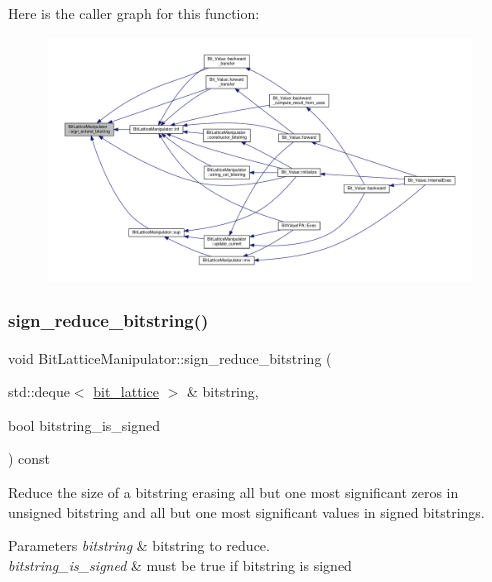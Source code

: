Here is the caller graph for this function\+:
\nopagebreak
\begin{figure}[H]
\begin{center}
\leavevmode
\includegraphics[width=350pt]{dd/d98/classBitLatticeManipulator_a4f374ceca7857bb7bc52a31f3f9872f9_icgraph}
\end{center}
\end{figure}
\mbox{\label{classBitLatticeManipulator_a1783e3d23d32aed27ec5ada1229516dc}} 
\subsubsection{\texorpdfstring{sign\+\_\+reduce\+\_\+bitstring()}{sign\_reduce\_bitstring()}}
{\footnotesize\ttfamily void Bit\+Lattice\+Manipulator\+::sign\+\_\+reduce\+\_\+bitstring (\begin{DoxyParamCaption}\item[{std\+::deque$<$ \hyperlink{bit__lattice_8hpp_ab732360111c810c4eaeb4c8b81d160d6}{bit\+\_\+lattice} $>$ \&}]{bitstring,  }\item[{bool}]{bitstring\+\_\+is\+\_\+signed }\end{DoxyParamCaption}) const\hspace{0.3cm}{\ttfamily [protected]}}



Reduce the size of a bitstring erasing all but one most significant zeros in unsigned bitstring and all but one most significant values in signed bitstrings. 


\begin{DoxyParams}{Parameters}
{\em bitstring} & bitstring to reduce. \\
\hline
{\em bitstring\+\_\+is\+\_\+signed} & must be true if bitstring is signed \\
\hline
\end{DoxyParams}


